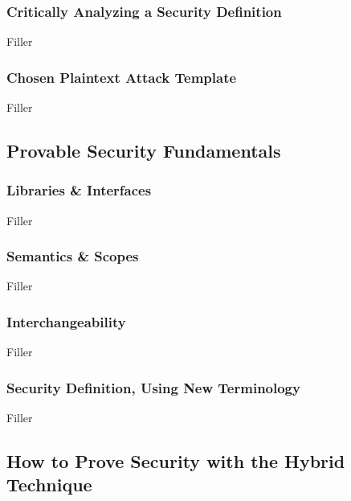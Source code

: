 \documentclass{article}
\begin{document}
\begin{adjustwidth}{2em}{}
\begin{adjustwidth}{2em}{4em}
				\subsubsection{Critically Analyzing a Security Definition}
				\begin{adjustwidth}{2em}{}
				Filler
				\end{adjustwidth}
				\subsubsection{Chosen Plaintext Attack Template}
				\begin{adjustwidth}{2em}{}
				Filler
				\end{adjustwidth}
			\end{adjustwidth}
			\subsection{Provable Security Fundamentals}
			\begin{adjustwidth}{2em}{}
				\subsubsection{Libraries \& Interfaces}
				\begin{adjustwidth}{2em}{}
				Filler
				\end{adjustwidth}
				\subsubsection{Semantics \& Scopes}
				\begin{adjustwidth}{2em}{}
				Filler
				\end{adjustwidth}
				\subsubsection{Interchangeability}
				\begin{adjustwidth}{2em}{}
				Filler
				\end{adjustwidth}
				\subsubsection{Security Definition, Using New Terminology}
				\begin{adjustwidth}{2em}{}
				Filler
				\end{adjustwidth}
			\end{adjustwidth}
			\subsection{How to Prove Security with the Hybrid Technique}
			\begin{adjustwidth}{2em}{}

\end{adjustwidth}
\end{adjustwidth}
\end{document}
